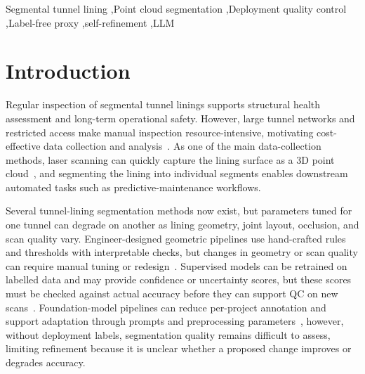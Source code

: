 \documentclass[a4paper,fleqn]{cas-dc}
\begin{document}
{%
\begin{keywords}
Segmental tunnel lining \sep Point cloud segmentation \sep Deployment quality control \sep Label-free proxy \sep self-refinement \sep LLM
\end{keywords}
\date{\today}

\maketitle

\smallskip

\section{Introduction}
\label{sec:intro}

Regular inspection of segmental tunnel linings supports structural health assessment and long-term operational safety. However, large tunnel networks and restricted access make manual inspection resource-intensive, motivating cost-effective data collection and analysis~\cite{attard2018,montero2015,strauss2020sensing}. As one of the main data-collection methods, laser scanning can quickly capture the lining surface as a 3D point cloud~\cite{huang2021bim,sjolander2023towards,weidner2024generalized}, and segmenting the lining into individual segments enables downstream automated tasks such as predictive-maintenance workflows.

Several tunnel-lining segmentation methods now exist, but parameters tuned for one tunnel can degrade on another as lining geometry, joint layout, occlusion, and scan quality vary. Engineer-designed geometric pipelines use hand-crafted rules and thresholds with interpretable checks, but changes in geometry or scan quality can require manual tuning or redesign~\cite{huang2021bim,weidner2024generalized,wang2025automated}. Supervised models can be retrained on labelled data and may provide confidence or uncertainty scores, but these scores must be checked against actual accuracy before they can support QC on new scans~\cite{su2024review,cha2024deep}. Foundation-model pipelines can reduce per-project annotation and support adaptation through prompts and preprocessing parameters~\cite{bommasani2021foundation,kirillov2023sam,ye2024sam}, however, without deployment labels, segmentation quality remains difficult to assess, limiting refinement because it is unclear whether a proposed change improves or degrades accuracy.

}
\end{document}
